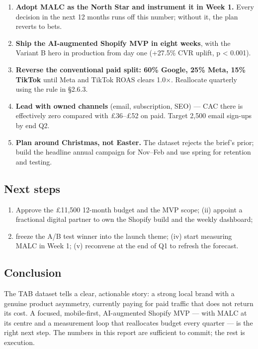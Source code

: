 \documentclass[
  11pt,
]{article}
\providecommand{\tightlist}{%
  \setlength{\itemsep}{0pt}\setlength{\parskip}{0pt}}
\begin{document}
\begin{enumerate}
\def\labelenumi{\arabic{enumi}.}
\tightlist
\item
  \textbf{Adopt MALC as the North Star and instrument it in Week 1.}
  Every decision in the next 12 months runs off this number; without it,
  the plan reverts to bets.
\item
  \textbf{Ship the AI-augmented Shopify MVP in eight weeks}, with the
  Variant B hero in production from day one (+27.5\% CVR uplift, p
  \textless{} 0.001).
\item
  \textbf{Reverse the conventional paid split: 60\% Google, 25\% Meta,
  15\% TikTok} until Meta and TikTok ROAS clears 1.0×. Reallocate
  quarterly using the rule in §2.6.3.
\item
  \textbf{Lead with owned channels} (email, subscription, SEO) --- CAC
  there is effectively zero compared with £36--£52 on paid. Target 2,500
  email sign-ups by end Q2.
\item
  \textbf{Plan around Christmas, not Easter.} The dataset rejects the
  brief's prior; build the headline annual campaign for Nov--Feb and use
  spring for retention and testing.
\end{enumerate}

\subsection{Next steps}\label{next-steps}

\begin{enumerate}
\def\labelenumi{(\roman{enumi})}
\tightlist
\item
  Approve the £11,500 12-month budget and the MVP scope; (ii) appoint a
  fractional digital partner to own the Shopify build and the weekly
  dashboard;
\item
  freeze the A/B test winner into the launch theme; (iv) start measuring
  MALC in Week 1; (v) reconvene at the end of Q1 to refresh the
  forecast.
\end{enumerate}

\subsection{Conclusion}\label{conclusion}

The TAB dataset tells a clear, actionable story: a strong local brand
with a genuine product asymmetry, currently paying for paid traffic that
does not return its cost. A focused, mobile-first, AI-augmented Shopify
MVP --- with MALC at its centre and a measurement loop that reallocates
budget every quarter --- is the right next step. The numbers in this
report are sufficient to commit; the rest is execution.
\end{document}
